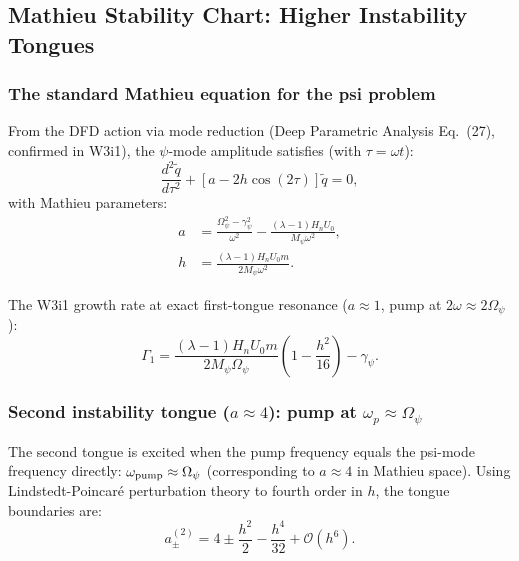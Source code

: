 \documentclass[11pt,twocolumn]{article}
\newcommand{\lam}{\lambda}
\newcommand{\Opsi}{\Omega_\psi}
\newcommand{\gpsi}{\gamma_\psi}
\newcommand{\Mpsi}{M_\psi}
\newcommand{\order}[1]{\mathcal{O}(#1)}
\begin{document}
\subsection{Mathieu Stability Chart: Higher Instability Tongues}
\label{sec:higher_tongues}

\subsubsection{The standard Mathieu equation for the psi problem}

From the DFD action via mode reduction (Deep Parametric Analysis
Eq.~(27), confirmed in W3i1), the $\psi$-mode amplitude satisfies
(with $\tau = \omega t$):
\begin{equation}
\frac{d^2\tilde{q}}{d\tau^2} + [a - 2h\cos(2\tau)]\tilde{q} = 0,
\label{eq:mathieu}
\end{equation}
with Mathieu parameters:
\begin{align}
a &= \frac{\Opsi^2 - \gpsi^2}{\omega^2}
  - \frac{(\lam-1)H_n U_0}{\Mpsi \omega^2},
\label{eq:a_param}\\
h &= \frac{(\lam-1) H_n U_0 m}{2\Mpsi\omega^2}.
\label{eq:h_param}
\end{align}

The W3i1 growth rate at exact first-tongue resonance ($a \approx 1$,
pump at $2\omega \approx 2\Opsi$):
\begin{equation}
\Gamma_1 = \frac{(\lam-1)H_n U_0 m}{2\Mpsi\Opsi}
\left(1 - \frac{h^2}{16}\right) - \gpsi.
\label{eq:Gamma1}
\end{equation}

\subsubsection{Second instability tongue ($a \approx 4$):
pump at $\omega_p \approx \Opsi$}
\label{sec:tongue2}

The second tongue is excited when the pump frequency equals the
psi-mode frequency directly: $\omega_{\rm pump} \approx \Opsi$
(corresponding to $a \approx 4$ in Mathieu space). Using
Lindstedt-Poincar\'e perturbation theory to fourth order in $h$,
the tongue boundaries are:
\begin{equation}
a_\pm^{(2)} = 4 \pm \frac{h^2}{2} - \frac{h^4}{32} + \order{h^6}.
\label{eq:tongue2_bounds}
\end{equation}
\end{document}

